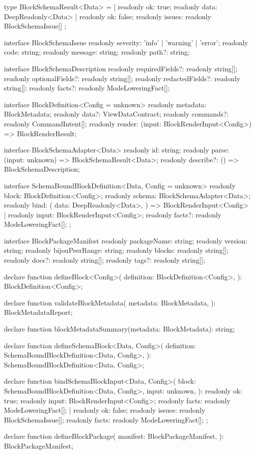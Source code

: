 \begin{CodeBlock}
type BlockSchemaResult<Data> =
  | { readonly ok: true; readonly data: DeepReadonly<Data> }
  | { readonly ok: false; readonly issues: readonly BlockSchemaIssue[] };

interface BlockSchemaIssue {
  readonly severity: 'info' | 'warning' | 'error';
  readonly code: string;
  readonly message: string;
  readonly path?: string;
}

interface BlockSchemaDescription {
  readonly requiredFields?: readonly string[];
  readonly optionalFields?: readonly string[];
  readonly redactedFields?: readonly string[];
  readonly facts?: readonly ModeLoweringFact[];
}

interface BlockDefinition<Config = unknown> {
  readonly metadata: BlockMetadata;
  readonly data?: ViewDataContract;
  readonly commands?: readonly CommandIntent[];
  readonly render: (input: BlockRenderInput<Config>) => BlockRenderResult;
}

interface BlockSchemaAdapter<Data> {
  readonly id: string;
  readonly parse: (input: unknown) => BlockSchemaResult<Data>;
  readonly describe?: () => BlockSchemaDescription;
}

interface SchemaBoundBlockDefinition<Data, Config = unknown> {
  readonly block: BlockDefinition<Config>;
  readonly schema: BlockSchemaAdapter<Data>;
  readonly bind: (
    data: DeepReadonly<Data>,
  ) => BlockRenderInput<Config> | {
    readonly input: BlockRenderInput<Config>;
    readonly facts?: readonly ModeLoweringFact[];
  };
}

interface BlockPackageManifest {
  readonly packageName: string;
  readonly version: string;
  readonly bijouPeerRange: string;
  readonly blocks: readonly string[];
  readonly docs?: readonly string[];
  readonly tags?: readonly string[];
}

declare function defineBlock<Config>(
  definition: BlockDefinition<Config>,
): BlockDefinition<Config>;

declare function validateBlockMetadata(
  metadata: BlockMetadata,
): BlockMetadataReport;

declare function blockMetadataSummary(metadata: BlockMetadata): string;

declare function defineSchemaBlock<Data, Config>(
  definition: SchemaBoundBlockDefinition<Data, Config>,
): SchemaBoundBlockDefinition<Data, Config>;

declare function bindSchemaBlockInput<Data, Config>(
  block: SchemaBoundBlockDefinition<Data, Config>,
  input: unknown,
): {
  readonly ok: true;
  readonly input: BlockRenderInput<Config>;
  readonly facts: readonly ModeLoweringFact[];
} | {
  readonly ok: false;
  readonly issues: readonly BlockSchemaIssue[];
  readonly facts: readonly ModeLoweringFact[];
};

declare function defineBlockPackage(
  manifest: BlockPackageManifest,
): BlockPackageManifest;
\end{CodeBlock}

